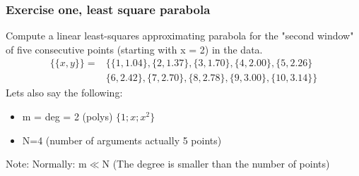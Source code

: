 



\subsubsection{Exercise one, least square parabola}\label{subsubsec:least_square_ex1}
Compute a linear least-squares approximating parabola for the "second window" of five consecutive points (starting with x = 2) in the data.
$$
\begin{aligned}
\{\{x, y\}\}=&\{\{1,1.04\},\{2,1.37\},\{3,1.70\},\{4,2.00\},\{5,2.26\}\\
&\{6,2.42\},\{7,2.70\},\{8,2.78\},\{9,3.00\},\{10,3.14\}\}
\end{aligned}
$$
Lets also say the following:
\begin{itemize}
    \item m = deg = 2 (polys)  $\{1;x;x^2\}$
    \item N=4 (number of arguments actually 5 points)
\end{itemize}
Note: Normally: m$\ll$N (The degree is smaller than the number of points)
